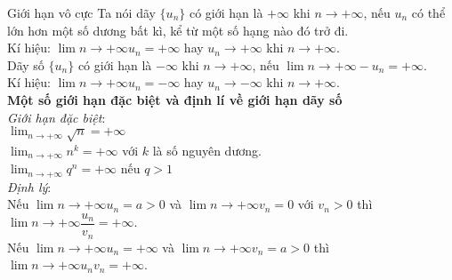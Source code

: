 \begin{dang}{Giới hạn vô cực}
	Ta nói dãy $\{u_n\}$ có giới hạn là $+ \infty$ khi $n \rightarrow + \infty$, nếu $u_n$ có thể lớn hơn một số dương bất kì, kể từ một số hạng nào đó trở đi. \\
	Kí hiệu: $\lim \limits{n \to +\infty}u_n = + \infty$ hay $u_n \rightarrow + \infty$ khi $n \rightarrow + \infty$. \\ 
	Dãy số $\{u_n\}$ có giới hạn là $- \infty$ khi $n \rightarrow + \infty$, nếu $\lim \limits{n \to +\infty}- u_n = + \infty$. \\
	Kí hiệu: $\lim \limits{n \to +\infty}u_n = - \infty$ hay $u_n \rightarrow - \infty$ khi $n \rightarrow + \infty$. \\ 
	\textbf{Một số giới hạn đặc biệt và định lí về giới hạn dãy số} \\
	\textit{Giới hạn đặc biệt}: \\
	$\displaystyle \lim_{n \rightarrow + \infty} \sqrt{n} = + \infty$ \\
	$\displaystyle \lim_{n \rightarrow + \infty} n^k = + \infty$ với $k$ là số nguyên dương. \\
	$\displaystyle \lim_{n \rightarrow + \infty} q^n = + \infty$ nếu $q > 1$ \\
	\textit{Định lý}: \\
	Nếu $\lim \limits{n \to +\infty}u_n = a > 0$ và $\lim \limits{n \to +\infty}v_n = 0$ với $v_n > 0$ thì $\lim \limits{n \to +\infty}\dfrac{u_n}{v_n} = + \infty$. \\
	Nếu $\lim \limits{n \to +\infty}u_n = + \infty$ và $\lim \limits{n \to +\infty}v_n = a > 0$ thì $\lim \limits{n \to +\infty}u_nv_n = + \infty$.
\end{dang}
